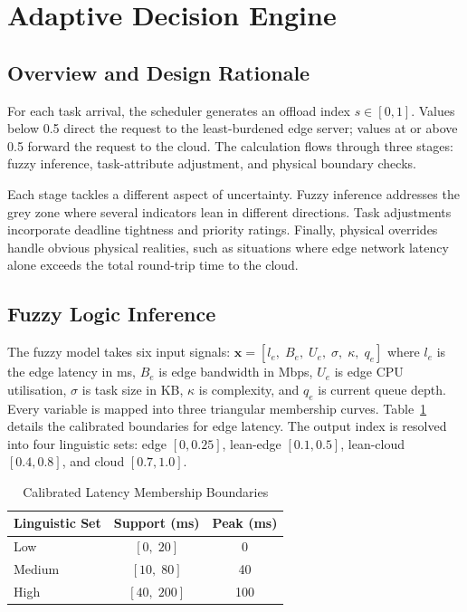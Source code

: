 \documentclass[conference]{IEEEtran}
\begin{document}
\section{Adaptive Decision Engine}
\label{sec:engine}

\subsection{Overview and Design Rationale}
For each task arrival, the scheduler generates an offload index $s \in [0,1]$. Values below 0.5 direct the request to the least-burdened edge server; values at or above 0.5 forward the request to the cloud. The calculation flows through three stages: fuzzy inference, task-attribute adjustment, and physical boundary checks.

Each stage tackles a different aspect of uncertainty. Fuzzy inference addresses the grey zone where several indicators lean in different directions. Task adjustments incorporate deadline tightness and priority ratings. Finally, physical overrides handle obvious physical realities, such as situations where edge network latency alone exceeds the total round-trip time to the cloud.

\subsection{Fuzzy Logic Inference}
The fuzzy model takes six input signals:
$\mathbf{x} = [l_e,\; B_e,\; U_e,\; \sigma,\; \kappa,\; q_e]$
where $l_e$ is the edge latency in ms, $B_e$ is edge bandwidth in Mbps, $U_e$ is edge CPU utilisation, $\sigma$ is task size in KB, $\kappa$ is complexity, and $q_e$ is current queue depth. Every variable is mapped into three triangular membership curves. Table~\ref{tab:mf} details the calibrated boundaries for edge latency. The output index is resolved into four linguistic sets: edge $[0, 0.25]$, lean-edge $[0.1, 0.5]$, lean-cloud $[0.4, 0.8]$, and cloud $[0.7, 1.0]$.

\begin{table}[h]
\centering
\caption{Calibrated Latency Membership Boundaries}
\label{tab:mf}
\begin{tabular}{lcc}
\toprule
\textbf{Linguistic Set} & \textbf{Support (ms)} & \textbf{Peak (ms)} \\
\midrule
Low    & $[0,\; 20]$   & 0   \\
Medium & $[10,\; 80]$  & 40  \\
High   & $[40,\; 200]$ & 100 \\
\bottomrule
\end{tabular}
\end{table}
\end{document}
